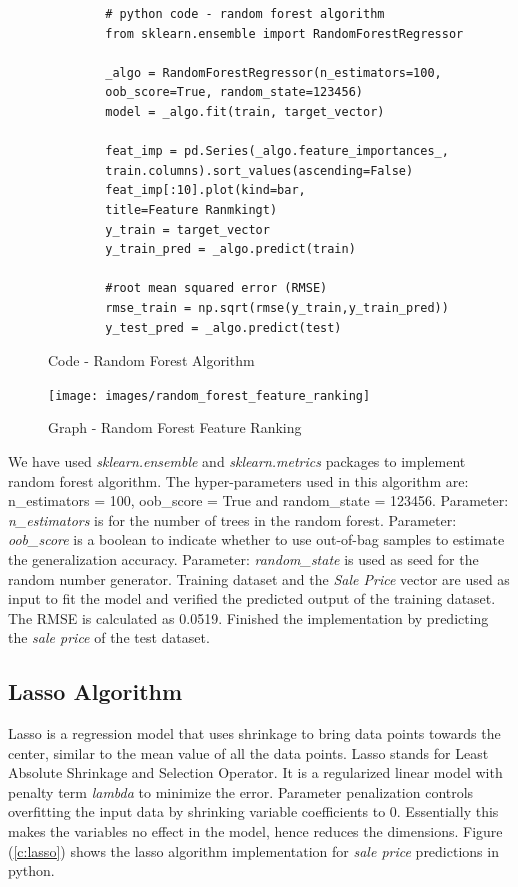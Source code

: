 \documentclass[sigconf]{acmart}
\begin{document}
	\begin{figure}[htb]
		\begin{verbatim}		
		# python code - random forest algorithm
		from sklearn.ensemble import RandomForestRegressor		
		
		_algo = RandomForestRegressor(n_estimators=100, 
		oob_score=True, random_state=123456)		
		model = _algo.fit(train, target_vector)  
		
		feat_imp = pd.Series(_algo.feature_importances_, 
		train.columns).sort_values(ascending=False)							
		feat_imp[:10].plot(kind=bar, 
		title=Feature Ranmkingt)		
		y_train = target_vector
		y_train_pred = _algo.predict(train)
		
		#root mean squared error (RMSE)
		rmse_train = np.sqrt(rmse(y_train,y_train_pred))			
		y_test_pred = _algo.predict(test)		
		\end{verbatim}
		\caption{Code - Random Forest Algorithm} \label{c:rf} 
	\end{figure}
	
	
	\begin{figure}[htb]
		\centering
		\texttt{[image: images/random\_forest\_feature\_ranking]}	
		\caption{Graph - Random Forest Feature Ranking} \label{fig:random-feature-ranking} 
	\end{figure}
	
	We have used {\em sklearn.ensemble} and {\em sklearn.metrics} packages to implement random forest algorithm. The hyper-parameters used in this algorithm are: n\_estimators = 100, oob\_score = True and random\_state = 123456. Parameter: {\em n\_estimators} is for the number of trees in the random forest. Parameter: {\em oob\_score} is a boolean to indicate whether to use out-of-bag samples to estimate the generalization accuracy. Parameter: {\em random\_state} is used as seed for the random number generator. Training dataset and the {\em Sale Price} vector are used as input to fit the model and verified the predicted output of the training dataset. The RMSE is calculated as 0.0519. Finished the implementation by predicting the {\em sale price} of the test dataset. 
	
	\subsection{Lasso Algorithm}
	
	Lasso is a regression model that uses shrinkage to bring data points towards the center, similar to the mean value of all the data points. Lasso stands for Least Absolute Shrinkage and Selection Operator. It is a regularized linear model with penalty term {\em lambda} to minimize the error. Parameter penalization controls overfitting the input data by shrinking variable coefficients to 0. Essentially this makes the variables no effect in the model, hence reduces the dimensions. Figure (\ref{c:lasso}) shows the lasso algorithm implementation for {\em sale price} predictions in python.
	
\end{document}

